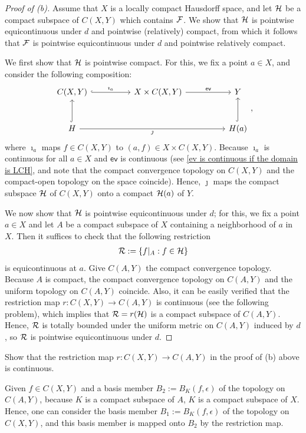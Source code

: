 \begin{proof}[Proof of (b)]
    Assume that $X$ is a locally compact Hausdorff space, and let ${\mathcal{H}}$ be a compact subspace of $C(X, Y)$ which contains ${\mathcal{F}}$.
    We show that ${\mathcal{H}}$ is pointwise equicontinuous under $d$ and pointwise (relatively) compact, from which it follows that ${\mathcal{F}}$ is pointwise equicontinuous under $d$ and pointwise relatively compact.

    We first show that ${\mathcal{H}}$ is pointwise compact.
    For this, we fix a point $a\in X$, and consider the following composition:
    \begin{equation*}
    \begin{tikzcd}[row sep=large, column sep=huge]
        C(X, Y)\arrow[r, "\imath_a", hook]
        &
        X\times C(X, Y)\arrow[r, "\textsf{ev}"]
        &
        Y
        \\
        H\arrow[rr, "\jmath"']\arrow[u, hook]
        &
        &
        H(a)\arrow[u, hook]
    \end{tikzcd},
    \end{equation*}
    where $\imath_a$ maps $f\in C(X, Y)$ to $(a, f)\in X\times C(X, Y)$.
    Because $\imath_a$ is continuous for all $a\in X$ and $\textsf{ev}$ is continuous (see \cref{ev is continuous if the domain is LCH}, and note that the compact convergence topology on $C(X, Y)$ and the compact-open topology on the space coincide).
    Hence, $\jmath$ maps the compact subspace ${\mathcal{H}}$ of $C(X, Y)$ onto a compact ${\mathcal{H}}(a)$ of $Y$.

    We now show that ${\mathcal{H}}$ is pointwise equicontinuous under $d$; for this, we fix a point $a\in X$ and let $A$ be a compact subspace of $X$ containing a neighborhood of $a$ in $X$.
    Then it suffices to check that the following restriction
    \begin{align*}
        {\mathcal{R}}:=\{f|_A: f\in{\mathcal{H}}\}
    \end{align*}
    is equicontinuous at $a$.
    Give $C(A, Y)$ the compact convergence topology.
    Because $A$ is compact, the compact convergence topology on $C(A, Y)$ and the uniform topology on $C(A, Y)$ coincide.
    Also, it can be easily verified that the restriction map $r: C(X, Y)\rightarrow C(A, Y)$ is continuous (see the following problem), which implies that ${\mathcal{R}}=r({\mathcal{H}})$ is a compact subspace of $C(A, Y)$.
    Hence, ${\mathcal{R}}$ is totally bounded under the uniform metric on $C(A, Y)$ induced by $d$, so ${\mathcal{R}}$ is pointwise equicontinuous under $d$.
\end{proof}
\begin{prob}
    Show that the restriction map $r: C(X, Y)\rightarrow C(A, Y)$ in the proof of (b) above is continuous.
\end{prob}
\begin{sol}
    Given $f\in C(X, Y)$ and a basis member $B_2:=B_K(f, \epsilon)$ of the topology on $C(A, Y)$, because $K$ is a compact subspace of $A$, $K$ is a compact subspace of $X$.
    Hence, one can consider the basis member $B_1:=B_K(f, \epsilon)$ of the topology on $C(X, Y)$, and this basis member is mapped onto $B_2$ by the restriction map.
\end{sol}

